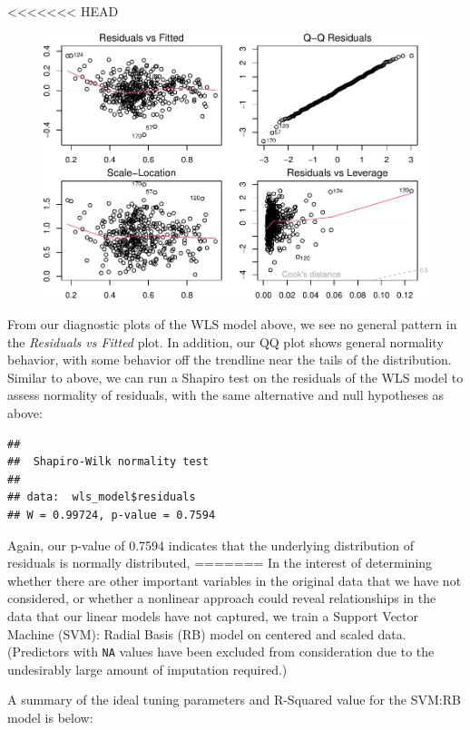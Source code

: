 \documentclass[
  man,floatsintext]{apa6}
\begin{document}
<<<<<<< HEAD
\begin{figure}[H]
\includegraphics[width=\textwidth]{final-project_files/figure-latex/plot-wls-model-1} \caption{ }\label{fig:plot-wls-model}
\end{figure}

From our diagnostic plots of the WLS model above, we see no general pattern in the \emph{Residuals vs Fitted} plot. In addition, our QQ plot shows general normality behavior, with some behavior off the trendline near the tails of the distribution. Similar to above, we can run a Shapiro test on the residuals of the WLS model to assess normality of residuals, with the same alternative and null hypotheses as above:

\begin{verbatim}
## 
##  Shapiro-Wilk normality test
## 
## data:  wls_model$residuals
## W = 0.99724, p-value = 0.7594
\end{verbatim}

Again, our p-value of 0.7594 indicates that the underlying distribution of residuals is normally distributed,
=======
In the interest of determining whether there are other important variables in the original data that we have not considered, or whether a nonlinear approach could reveal relationships in the data that our linear models have not captured, we train a Support Vector Machine (SVM): Radial Basis (RB) model on centered and scaled data. (Predictors with \texttt{NA} values have been excluded from consideration due to the undesirably large amount of imputation required.)

A summary of the ideal tuning parameters and R-Squared value for the SVM:RB model is below:
\end{document}
